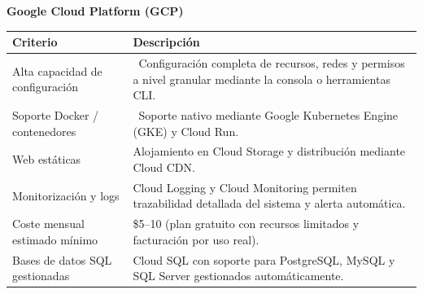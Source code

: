 \begin{center}
	\renewcommand{\arraystretch}{1.2}
	\setlength{\tabcolsep}{6pt}
	\textbf{Google Cloud Platform (GCP)}\\[4pt]
	\begin{tabularx}{\textwidth}{|l|X|}
		\hline
		\textbf{Criterio}               & \textbf{Descripción}                                                                                                      \\
		\hline
		Alta capacidad de configuración & \checkmark\ Configuración completa de recursos, redes y permisos a nivel granular mediante la consola o herramientas CLI. \\
		\hline
		Soporte Docker / contenedores   & \checkmark\ Soporte nativo mediante Google Kubernetes Engine (GKE) y Cloud Run.                                           \\
		\hline
		Web estáticas                   & Alojamiento en Cloud Storage y distribución mediante Cloud CDN.                                                           \\
		\hline
		Monitorización y logs           & Cloud Logging y Cloud Monitoring permiten trazabilidad detallada del sistema y alerta automática.                         \\
		\hline
		Coste mensual estimado mínimo   & \$5--10 (plan gratuito con recursos limitados y facturación por uso real).                                                \\
		\hline
		Bases de datos SQL gestionadas  & Cloud SQL con soporte para PostgreSQL, MySQL y SQL Server gestionados automáticamente.                                    \\
		\hline
	\end{tabularx}
\end{center}

\vspace{8pt}

